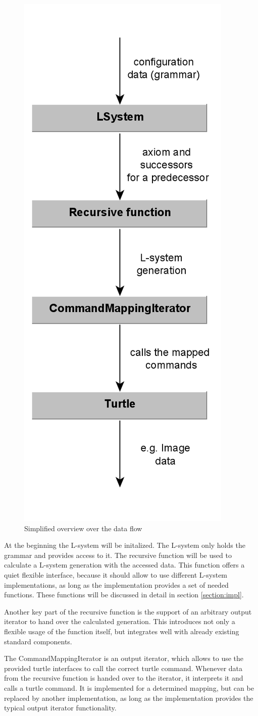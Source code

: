 \documentclass[english]{cpp-hmwk}
\begin{document}
\begin{figure}[h!]
	\centering
	\includegraphics[width=0.4\columnwidth]{../graphs/overview.png}
	\caption{Simplified overview over the data flow}
	\label{figure:overview}
\end{figure}

\medskip

\noindent At the beginning the L-system will be initalized. The L-system only holds the grammar and provides access to it. The recursive function will be used to calculate a L-system generation with the accessed data. This function offers a quiet flexible interface, because it should allow to use different L-system implementations, as long as the implementation provides a set of needed functions. These functions will be discussed in detail in section \ref{section:impl}. 

Another key part of the recursive function is the support of an arbitrary output iterator to hand over the calculated generation. This introduces not only a flexible usage of the function itself, but integrates well with already existing standard components. 

The CommandMappingIterator is an output iterator, which allows to use the provided turtle interfaces to call the correct turtle command. Whenever data from the recursive function is handed over to the iterator, it interprets it and calls a turtle command. It is implemented for a determined mapping, but can be replaced by another implementation, as long as the implementation provides the typical output iterator functionality.
\end{document}
